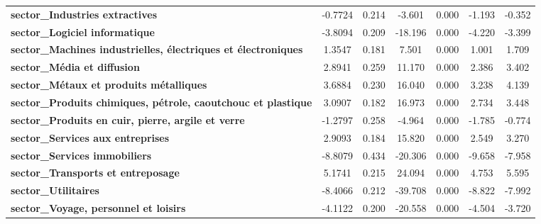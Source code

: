 \begin{center}
\begin{tabular}{lcccccc}
\textbf{sector\_Industries extractives}                               &      -0.7724  &        0.214     &    -3.601  &         0.000        &       -1.193    &       -0.352     \\
\textbf{sector\_Logiciel informatique}                                &      -3.8094  &        0.209     &   -18.196  &         0.000        &       -4.220    &       -3.399     \\
\textbf{sector\_Machines industrielles, électriques et électroniques} &       1.3547  &        0.181     &     7.501  &         0.000        &        1.001    &        1.709     \\
\textbf{sector\_Média et diffusion}                                   &       2.8941  &        0.259     &    11.170  &         0.000        &        2.386    &        3.402     \\
\textbf{sector\_Métaux et produits métalliques}                       &       3.6884  &        0.230     &    16.040  &         0.000        &        3.238    &        4.139     \\
\textbf{sector\_Produits chimiques, pétrole, caoutchouc et plastique} &       3.0907  &        0.182     &    16.973  &         0.000        &        2.734    &        3.448     \\
\textbf{sector\_Produits en cuir, pierre, argile et verre}            &      -1.2797  &        0.258     &    -4.964  &         0.000        &       -1.785    &       -0.774     \\
\textbf{sector\_Services aux entreprises}                             &       2.9093  &        0.184     &    15.820  &         0.000        &        2.549    &        3.270     \\
\textbf{sector\_Services immobiliers}                                 &      -8.8079  &        0.434     &   -20.306  &         0.000        &       -9.658    &       -7.958     \\
\textbf{sector\_Transports et entreposage}                            &       5.1741  &        0.215     &    24.094  &         0.000        &        4.753    &        5.595     \\
\textbf{sector\_Utilitaires}                                          &      -8.4066  &        0.212     &   -39.708  &         0.000        &       -8.822    &       -7.992     \\
\textbf{sector\_Voyage, personnel et loisirs}                         &      -4.1122  &        0.200     &   -20.558  &         0.000        &       -4.504    &       -3.720     \\

\end{tabular}
\end{center}
